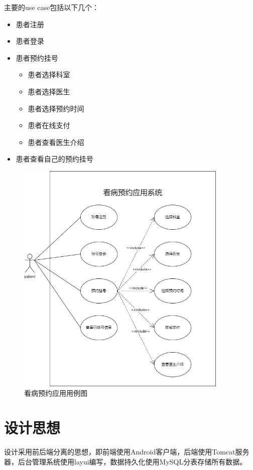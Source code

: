 \documentclass[UTF8,12pt]{article}
\begin{document}
主要的use case包括以下几个：
\begin{itemize}
    \item 患者注册
    \item 患者登录
    \item 患者预约挂号
    \begin{itemize}
        \item 患者选择科室
        \item 患者选择医生
        \item 患者选择预约时间
        \item 患者在线支付
        \item 患者查看医生介绍
    \end{itemize}
    \item 患者查看自己的预约挂号
\end{itemize}

\begin{figure}[htbp]
    \centering
    \includegraphics[width=0.9\textwidth]{imgs/1.png}
    \caption{看病预约应用用例图}
\end{figure}

\newpage

\section{设计思想}
设计采用前后端分离的思想，即前端使用Android客户端，后端使用Tomcat服务器，后台管理系统使用layui编写，数据持久化使用MySQL分表存储所有数据。
\end{document}
